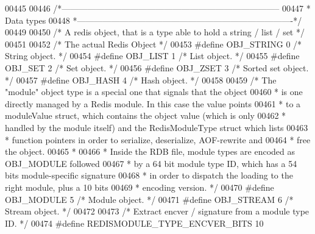 \begin{DoxyCode}
{{{{{{00445 
00446 \textcolor{comment}{/*-----------------------------------------------------------------------------}
00447 \textcolor{comment}{ * Data types}
00448 \textcolor{comment}{ *----------------------------------------------------------------------------*/}
00449 
00450 \textcolor{comment}{/* A redis object, that is a type able to hold a string / list / set */}
00451 
00452 \textcolor{comment}{/* The actual Redis Object */}
00453 \textcolor{preprocessor}{#}\textcolor{preprocessor}{define} \textcolor{preprocessor}{OBJ\_STRING} 0    \textcolor{comment}{/* String object. */}
00454 \textcolor{preprocessor}{#}\textcolor{preprocessor}{define} \textcolor{preprocessor}{OBJ\_LIST} 1      \textcolor{comment}{/* List object. */}
00455 \textcolor{preprocessor}{#}\textcolor{preprocessor}{define} \textcolor{preprocessor}{OBJ\_SET} 2       \textcolor{comment}{/* Set object. */}
00456 \textcolor{preprocessor}{#}\textcolor{preprocessor}{define} \textcolor{preprocessor}{OBJ\_ZSET} 3      \textcolor{comment}{/* Sorted set object. */}
00457 \textcolor{preprocessor}{#}\textcolor{preprocessor}{define} \textcolor{preprocessor}{OBJ\_HASH} 4      \textcolor{comment}{/* Hash object. */}
00458 
00459 \textcolor{comment}{/* The "module" object type is a special one that signals that the object}
00460 \textcolor{comment}{ * is one directly managed by a Redis module. In this case the value points}
00461 \textcolor{comment}{ * to a moduleValue struct, which contains the object value (which is only}
00462 \textcolor{comment}{ * handled by the module itself) and the RedisModuleType struct which lists}
00463 \textcolor{comment}{ * function pointers in order to serialize, deserialize, AOF-rewrite and}
00464 \textcolor{comment}{ * free the object.}
00465 \textcolor{comment}{ *}
00466 \textcolor{comment}{ * Inside the RDB file, module types are encoded as OBJ\_MODULE followed}
00467 \textcolor{comment}{ * by a 64 bit module type ID, which has a 54 bits module-specific signature}
00468 \textcolor{comment}{ * in order to dispatch the loading to the right module, plus a 10 bits}
00469 \textcolor{comment}{ * encoding version. */}
00470 \textcolor{preprocessor}{#}\textcolor{preprocessor}{define} \textcolor{preprocessor}{OBJ\_MODULE} 5    \textcolor{comment}{/* Module object. */}
00471 \textcolor{preprocessor}{#}\textcolor{preprocessor}{define} \textcolor{preprocessor}{OBJ\_STREAM} 6    \textcolor{comment}{/* Stream object. */}
00472 
00473 \textcolor{comment}{/* Extract encver / signature from a module type ID. */}
00474 \textcolor{preprocessor}{#}\textcolor{preprocessor}{define} \textcolor{preprocessor}{REDISMODULE\_TYPE\_ENCVER\_BITS} 10
}}}}}}
\end{DoxyCode}
